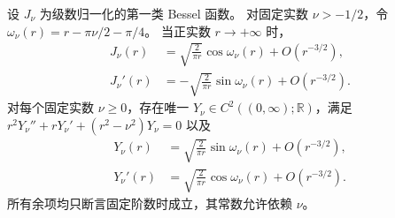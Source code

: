 \begin{theorem}[实轴 Bessel 渐近]
\label{b2:thm:A2-bessel-asymptotic}
设 \(J_\nu\) 为级数归一化的第一类 Bessel 函数。
对固定实数 \(\nu>-1/2\)，令
\(\omega_\nu(r)=r-\pi\nu/2-\pi/4\)。
当正实数 \(r\to+\infty\) 时，
\[
 \begin{aligned}
 J_\nu(r)&=\sqrt{\frac2{\pi r}}\cos\omega_\nu(r)+O(r^{-3/2}),\\
 J_\nu'(r)&=-\sqrt{\frac2{\pi r}}\sin\omega_\nu(r)+O(r^{-3/2}).
 \end{aligned}
\]
对每个固定实数 \(\nu\geq0\)，存在唯一
\(Y_\nu\in C^2((0,\infty);\mathbb R)\)，满足
\(r^2Y_\nu''+rY_\nu'+(r^2-\nu^2)Y_\nu=0\) 以及
\[
 \begin{aligned}
 Y_\nu(r)&=\sqrt{\frac2{\pi r}}\sin\omega_\nu(r)+O(r^{-3/2}),\\
 Y_\nu'(r)&=\sqrt{\frac2{\pi r}}\cos\omega_\nu(r)+O(r^{-3/2}).
 \end{aligned}
\]
所有余项均只断言固定阶数时成立，其常数允许依赖 \(\nu\)。
\end{theorem}
